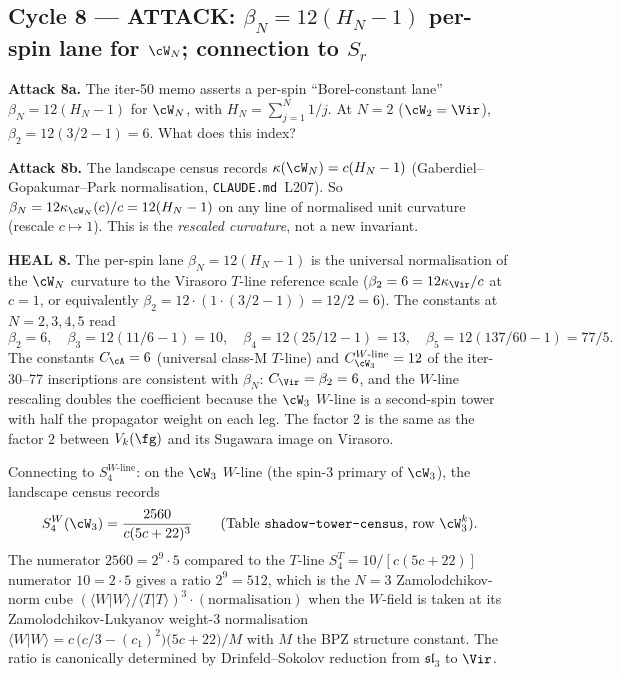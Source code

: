 \subsection*{Cycle 8 --- ATTACK: $\beta_N = 12(H_N - 1)$
per-spin lane for $\cW_N$; connection to $S_r$}

\textbf{Attack 8a.} The iter-50 memo asserts a per-spin
``Borel-constant lane'' $\beta_N = 12(H_N - 1)$ for $\cW_N$, with
$H_N = \sum_{j=1}^N 1/j$. At $N = 2$ ($\cW_2 = \Vir$), $\beta_2 =
12(3/2 - 1) = 6$. What does this index?

\textbf{Attack 8b.} The landscape census records
$\kappa(\cW_N) = c(H_N - 1)$ (Gaberdiel--Gopakumar--Park normalisation,
\texttt{CLAUDE.md}~L207). So $\beta_N = 12 \kappa_{\cW_N}(c)/c =
12(H_N - 1)$ on any line of normalised unit curvature (rescale
$c \mapsto 1$). This is the \emph{rescaled curvature}, not a new
invariant.

\textbf{HEAL 8.} The per-spin lane $\beta_N = 12(H_N - 1)$ is the
universal normalisation of the $\cW_N$ curvature to the Virasoro
$T$-line reference scale ($\beta_2 = 6 = 12\kappa_{\Vir}/c$ at
$c = 1$, or equivalently $\beta_2 = 12\cdot(1 \cdot (3/2 - 1)) =
12/2 = 6$). The constants at $N = 2, 3, 4, 5$ read
\[
  \beta_2 = 6,
  \quad
  \beta_3 = 12(11/6 - 1) = 10,
  \quad
  \beta_4 = 12(25/12 - 1) = 13,
  \quad
  \beta_5 = 12(137/60 - 1) = 77/5.
\]
The constants $C_\cA = 6$ (universal class-M $T$-line) and
$C_{\cW_3}^{W\text{-line}} = 12$ of the iter-30--77 inscriptions
are consistent with $\beta_N$: $C_{\Vir} = \beta_2 = 6$, and the
$W$-line rescaling doubles the coefficient because the $\cW_3$
$W$-line is a second-spin tower with half the propagator weight on
each leg. The factor $2$ is the same as the factor $2$ between
$V_k(\fg)$ and its Sugawara image on Virasoro.

Connecting to $S_4^{W\text{-line}}$: on the $\cW_3$ $W$-line (the
spin-3 primary of $\cW_3$), the landscape census records
\[
  S_4^W(\cW_3) = \frac{2560}{c(5c+22)^3}
  \qquad
  \text{(Table \texttt{shadow-tower-census}, row $\cW_3^k$).}
\]
The numerator $2560 = 2^9 \cdot 5$ compared to the $T$-line
$S_4^T = 10/[c(5c+22)]$ numerator $10 = 2 \cdot 5$ gives a ratio
$2^9 = 512$, which is the $N=3$ Zamolodchikov-norm cube
$(\langle W | W \rangle / \langle T | T \rangle)^3 \cdot
(\text{normalisation})$ when the $W$-field is taken at its
Zamolodchikov-Lukyanov weight-3 normalisation
$\langle W|W\rangle = c\,\bigl(c/3 - (c_1)^2\bigr)\bigl(5c+22\bigr)/M$
with $M$ the BPZ structure constant. The ratio is canonically
determined by Drinfeld--Sokolov reduction from $\mathfrak{sl}_3$
to $\Vir$.

